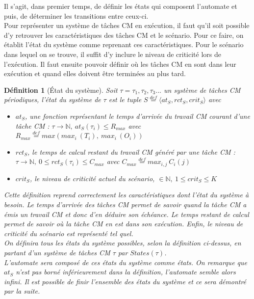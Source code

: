 \documentclass[12pt,a4paper,oneside]{book}
\theoremstyle{break}
\newtheorem{defin}{Définition}[chapter]
\theoremstyle{breakplain}
\begin{document}
Il s'agit, dans premier temps, de définir les états qui composent l'automate et puis, de déterminer les transitions entre ceux-ci.\\

Pour représenter un système de tâches CM en exécution, il faut qu'il soit possible d'y retrouver les caractéristiques des tâches CM et le scénario. Pour ce faire, on établit l'état du système comme reprenant ces caractéristiques. Pour le scénario dans lequel on se trouve, il suffit d'y inclure le niveau de criticité lors de l'exécution. Il faut ensuite pouvoir définir où les tâches CM en sont dans leur exécution et quand elles doivent être terminées au plus tard.\\

\begin{defin}[État du système]
Soit $\tau = \tau_1, \tau_2, \tau_3 ...$ un système de tâches CM périodiques, l'état du système de $\tau$ est le tuple $S \overset{def}{=} \langle at_S, rct_S, crit_S\rangle$ avec
\begin{itemize}
\item $at_S$, une fonction représentant le temps d'arrivée du travail CM courant d'une tâche CM : $\tau \rightarrow \mathbb{N},\ at_S(\tau_i) \leq R_{max}$ avec $R_{max} \overset{def}{=} max(max_i\ (T_i),\ max_i\ (O_i))$
\item $rct_S$, le temps de calcul restant du travail CM généré par une tâche CM : $ \tau \rightarrow \mathbb{N},\ 0 \leq rct_S(\tau_i) \leq C_{max}$ avec $C_{max} \overset{def}{=} max_{i,j}\ C_i(j)$
\item $crit_S$, le niveau de criticité actuel du scénario, $ \in \mathbb{N},\ 1 \leq crit_S \leq K$\\
\end{itemize}

Cette définition reprend correctement les caractéristiques dont l'état du système à besoin. Le temps d'arrivée des tâches CM permet de savoir quand la tâche CM a émis un travail CM et donc d'en déduire son échéance. Le temps restant de calcul permet de savoir où la tâche CM en est dans son exécution. Enfin, le niveau de criticité du scénario est représenté tel quel.\\

On définira tous les états du système possibles, selon la définition ci-dessus, en partant d'un système de tâches CM $\tau$ par $States(\tau)$.\\

L'automate sera composé de ces états du système comme états. On remarque que $at_S$ n'est pas borné inférieurement dans la définition, l'automate semble alors infini. Il est possible de finir l'ensemble des états du système et ce sera démontré par la suite.\\


\end{defin}
\end{document}
